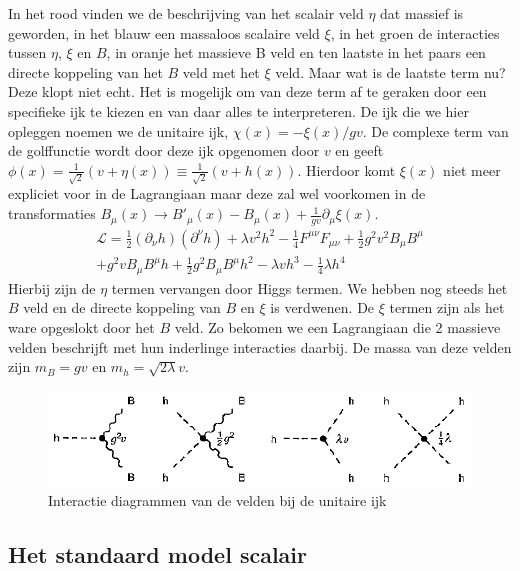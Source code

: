 \documentclass[../main.tex]{subfiles}
\begin{document}
In het rood vinden we de beschrijving van het scalair veld $\eta$ dat massief is geworden, in het blauw een massaloos scalaire veld $\xi$, in het groen de interacties tussen $\eta$, $\xi$ en $B$, in oranje het massieve B veld en ten laatste in het paars een directe koppeling van het $B$ veld met het $\xi$ veld. Maar wat is de laatste term nu? Deze klopt niet echt. Het is mogelijk om van deze term af te geraken door een specifieke ijk te kiezen en van daar alles te interpreteren. De ijk die we hier opleggen noemen we de unitaire ijk, $\chi(x) = -\xi(x)/gv$. De complexe term van de golffunctie wordt door deze ijk opgenomen door $v$ en geeft $\phi(x) = \frac{1}{\sqrt{2}} (v+\eta(x)) \equiv \frac{1}{\sqrt{2}} (v+h(x))$. Hierdoor komt $\xi(x)$ niet meer expliciet voor in de Lagrangiaan maar deze zal wel voorkomen in de transformaties $B_\mu (x) \rightarrow B'_\mu(x) - B_\mu(x) + \frac{1}{gv} \partial_\mu \xi(x)$.
\begin{equation}
    \begin{aligned}
        \label{eq:comp_scal_veld_lagr_unitaire_ijk}
        \mathcal{L} = \frac{1}{2} (\partial_\nu h)(\partial^\nu h) + \lambda v^2 h^2 - \frac{1}{4} F^{\mu\nu}F_{\mu\nu} + \frac{1}{2} g^2v^2B_\mu B^\mu\\
        + g^2vB_\mu B^\mu h + \frac{1}{2} g^2 B_\mu B^\mu h^2 - \lambda vh^3 - \frac{1}{4} \lambda h^4
    \end{aligned}
\end{equation}
Hierbij zijn de $\eta$ termen vervangen door Higgs termen. We hebben nog steeds het $B$ veld en de directe koppeling van $B$ en $\xi$ is verdwenen. De $\xi$ termen zijn als het ware opgeslokt door het $B$ veld. Zo bekomen we een Lagrangiaan die 2 massieve velden beschrijft met hun inderlinge interacties daarbij. De massa van deze velden zijn $m_B = gv$ en $m_h = \sqrt{2\lambda}v$.

\begin{figure}[h]
    \centering
    \includegraphics[width=0.8\linewidth]{higgs_boson/complex_scal_int_unitaire_ijk.png}
    \caption{Interactie diagrammen van de velden bij de unitaire ijk}%
    \label{fig:higgs_boson/complex_scal_int_unitaire_ijk}
\end{figure}

\subsection{Het standaard model scalair}%
\label{sub:het_standaard_model_scalair}
\end{document}
